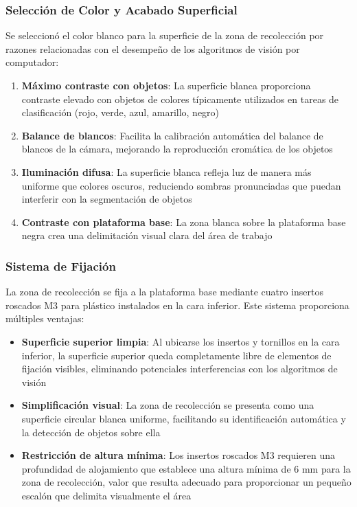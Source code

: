 \subsubsection{Selección de Color y Acabado Superficial}

Se seleccionó el color blanco para la superficie de la zona de recolección por razones relacionadas con el desempeño de los algoritmos de visión por computador:

\begin{enumerate}
    \item \textbf{Máximo contraste con objetos}: La superficie blanca proporciona contraste elevado con objetos de colores típicamente utilizados en tareas de clasificación (rojo, verde, azul, amarillo, negro)
    
    \item \textbf{Balance de blancos}: Facilita la calibración automática del balance de blancos de la cámara, mejorando la reproducción cromática de los objetos
    
    \item \textbf{Iluminación difusa}: La superficie blanca refleja luz de manera más uniforme que colores oscuros, reduciendo sombras pronunciadas que puedan interferir con la segmentación de objetos
    
    \item \textbf{Contraste con plataforma base}: La zona blanca sobre la plataforma base negra crea una delimitación visual clara del área de trabajo
\end{enumerate}

\subsubsection{Sistema de Fijación}

La zona de recolección se fija a la plataforma base mediante cuatro insertos roscados M3 para plástico instalados en la cara inferior. Este sistema proporciona múltiples ventajas:

\begin{itemize}
    \item \textbf{Superficie superior limpia}: Al ubicarse los insertos y tornillos en la cara inferior, la superficie superior queda completamente libre de elementos de fijación visibles, eliminando potenciales interferencias con los algoritmos de visión
    
    \item \textbf{Simplificación visual}: La zona de recolección se presenta como una superficie circular blanca uniforme, facilitando su identificación automática y la detección de objetos sobre ella
    
    \item \textbf{Restricción de altura mínima}: Los insertos roscados M3 requieren una profundidad de alojamiento que establece una altura mínima de 6 mm para la zona de recolección, valor que resulta adecuado para proporcionar un pequeño escalón que delimita visualmente el área
\end{itemize}

